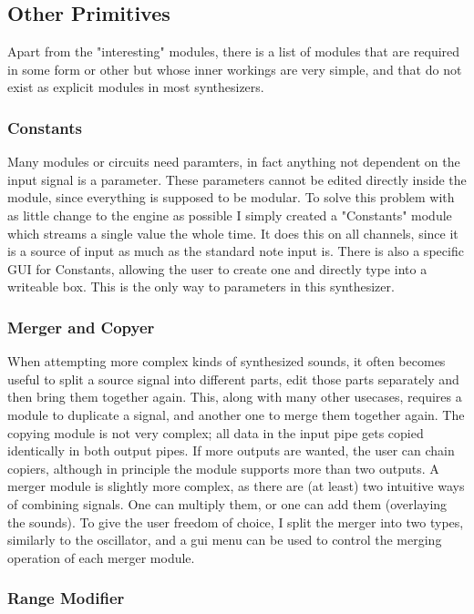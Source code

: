 \documentclass[11pt,a4paper]{article}
\begin{document}
\subsection{Other Primitives}

Apart from the "interesting" modules, there is a list of modules that are required in some form or other but whose inner workings are very simple, and that do not exist as explicit modules in most synthesizers.

\subsubsection{Constants}

Many modules or circuits need paramters, in fact anything not dependent on the input signal is a parameter. These parameters cannot be edited directly inside the module, since everything is supposed to be modular. To solve this problem with as little change to the engine as possible I simply created a "Constants" module which streams a single value the whole time. It does this on all channels, since it is a source of input as much as the standard note input is. There is also a specific GUI for Constants, allowing the user to create one and directly type into a writeable box. This is the only way to parameters in this synthesizer.

\subsubsection{Merger and Copyer}

When attempting more complex kinds of synthesized sounds, it often becomes useful to split a source signal into different parts, edit those parts separately and then bring them together again. This, along with many other usecases, requires a module to duplicate a signal, and another one to merge them together again. The copying module is not very complex; all data in the input pipe gets copied identically in both output pipes. If more outputs are wanted, the user can chain copiers, although in principle the module supports more than two outputs.
A merger module is slightly more complex, as there are (at least) two intuitive ways of combining signals. One can multiply them, or one can add them (overlaying the sounds). To give the user freedom of choice, I split the merger into two types, similarly to the oscillator, and a gui menu can be used to control the merging operation of each merger module.

\subsubsection{Range Modifier}
\end{document}

